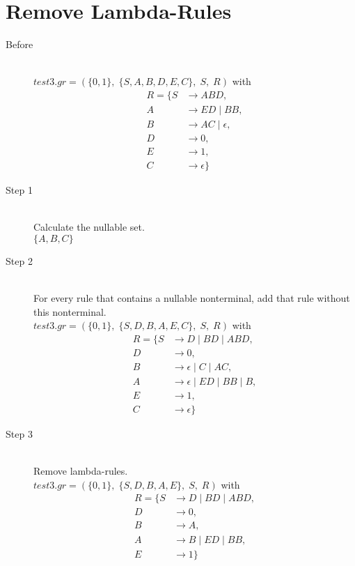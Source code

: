 \documentclass{article}
\begin{document}
\section{Remove Lambda-Rules}

\begin{description}
	\item[Before] \hfill \\ 
		$test3.gr=(\{	0, 1\},\;\{ S, A, B, D, E, C\},\;S,\;R)$ with
	\begin{align*}
		R=\{	S &\rightarrow ABD, \\ 
		A &\rightarrow ED\;|\;BB, \\ 
		B &\rightarrow AC\;|\;\epsilon, \\ 
		D &\rightarrow 0, \\ 
		E &\rightarrow 1, \\ 
		C &\rightarrow \epsilon\}
	\end{align*}
	\item[Step 1] \hfill \\ 
	Calculate the nullable set.\\ 
	$\{	A, 	B, 	C\}$
	\item[Step 2] \hfill \\ 
	For every rule that contains a nullable nonterminal, add that rule without this nonterminal.\\ 
	$test3.gr=(\{	0, 1\},\;\{ S, D, B, A, E, C\},\;S,\;R)$ with
	\begin{align*}
		R=\{	S &\rightarrow D\;|\;BD\;|\;ABD, \\ 
		D &\rightarrow 0, \\ 
		B &\rightarrow \epsilon\;|\;C\;|\;AC, \\ 
		A &\rightarrow \epsilon\;|\;ED\;|\;BB\;|\;B, \\ 
		E &\rightarrow 1, \\ 
		C &\rightarrow \epsilon\}
	\end{align*}
	\item[Step 3] \hfill \\ 
	Remove lambda-rules.\\ 
	$test3.gr=(\{	0, 1\},\;\{ S, D, B, A, E\},\;S,\;R)$ with
	\begin{align*}
		R=\{	S &\rightarrow D\;|\;BD\;|\;ABD, \\ 
		D &\rightarrow 0, \\ 
		B &\rightarrow A, \\ 
		A &\rightarrow B\;|\;ED\;|\;BB, \\ 
		E &\rightarrow 1\}
	\end{align*}
\end{description}
\end{document}
